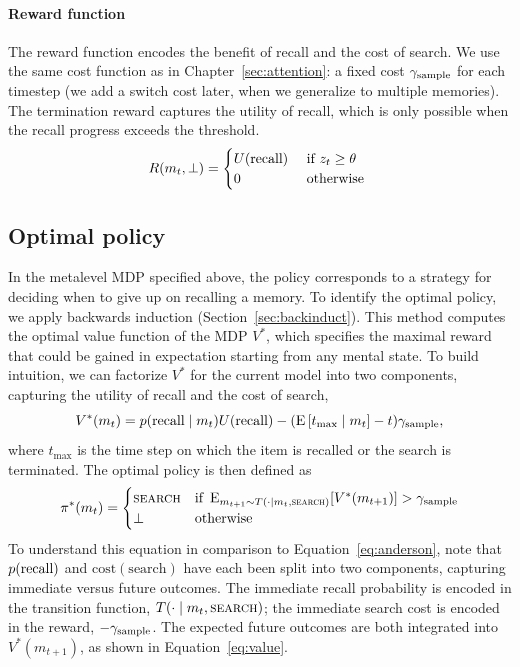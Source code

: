 \paragraph{Reward function}
The reward function encodes the benefit of recall and the cost of search. We use the same cost function as in Chapter~\ref{sec:attention}: a fixed cost $\gamma_\text{sample}$ for each timestep (we add a switch cost later, when we generalize to multiple memories). The termination reward captures the utility of recall, which is only possible when the recall progress exceeds the threshold.
\begin{equation}\label{eq:reward}
  R(m_t, \bot) = \begin{cases} 
    U({\text{recall}}) & \text{ if } z_t \geq \theta \\
    0 & \text{ otherwise }
  \end{cases}
\end{equation}

\subsection{Optimal policy}

In the metalevel MDP specified above, the policy corresponds to a strategy for deciding when to give up on recalling a memory. To identify the optimal policy, we apply backwards induction (Section~\ref{sec:backinduct}). This method computes the optimal value function of the MDP $V^*$, which specifies the maximal reward that could be gained in expectation starting from any mental state. To build intuition, we can factorize $V^*$ for the current model into two components, capturing the utility of recall and the cost of search,
%
\begin{equation}\label{eq:value}
  V^*(m_t) = p(\text{recall} \mid m_t) U({\text{recall}}) - 
  (\operatorname*{E}\left[t_\text{max}\mid m_t\right] - t)\gamma_\text{sample},
\end{equation}
%
where $t_\text{max}$ is the time step on which the item is recalled or the search is terminated. The optimal policy is then defined as
%
\begin{equation}\label{eq:policy}
  \pi^*(m_t) = \begin{cases}
    \textsc{search} & \text{if } \operatorname*{E}_{m_{t+1} \sim T(\cdot \mid m_t, \textsc{search})}[V^*(m_{t+1})] > \gamma_\text{sample} \\
    \bot & \text{otherwise}
  \end{cases}
\end{equation}
%
To understand this equation in comparison to Equation~\ref{eq:anderson}, note that $p({\text{recall}})$ and $\text{cost}(\text{search})$ have each been split into two components, capturing immediate versus future outcomes. The immediate recall probability is encoded in the transition function, $T(\cdot \mid m_t, \textsc{search})$; the immediate search cost is encoded in the reward, $-\gamma_\text{sample}$. The expected future outcomes are both integrated into $V^*(m_{t+1})$, as shown in Equation~\ref{eq:value}.


